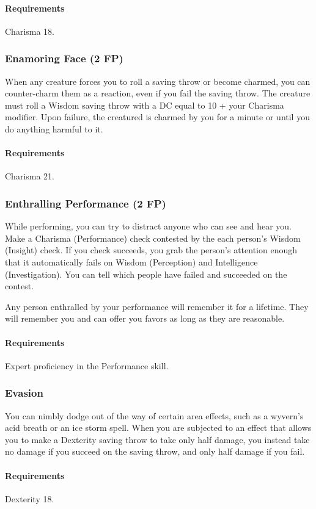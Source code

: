     \paragraph{Requirements} Charisma 18.
\subsubsection{Enamoring Face (2 FP)} \label{feat::enamoringface}
    When any creature forces you to roll a saving throw or become charmed, you can counter-charm them as a reaction, even if you fail the saving throw.
    The creature must roll a Wisdom saving throw with a DC equal to 10 + your Charisma modifier.
    Upon failure, the creatured is charmed by you for a minute or until you do anything harmful to it.
    \paragraph{Requirements} Charisma 21.
\subsubsection{Enthralling Performance (2 FP)} \label{feat::enthrallingperformance}
    While performing, you can try to distract anyone who can see and hear you.
    Make a Charisma (Performance) check contested by the each person's Wisdom (Insight) check.
    If you check succeeds, you grab the person's attention enough that it automatically fails on Wisdom (Perception) and Intelligence (Investigation).
    You can tell which people have failed and succeeded on the contest.

    Any person enthralled by your performance will remember it for a lifetime.
    They will remember you and can offer you favors as long as they are reasonable.
    \paragraph{Requirements} Expert proficiency in the Performance skill.
\subsubsection{Evasion} \label{feat::evasion}
    You can nimbly dodge out of the way of certain area effects, such as a wyvern's acid breath or an ice storm spell.
    When you are subjected to an effect that allows you to make a Dexterity saving throw to take only half damage, you instead take no damage if you succeed on the saving throw, and only half damage if you fail.
    \paragraph{Requirements} Dexterity 18.

